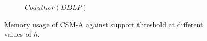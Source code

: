 \begin{figure}[b]
\begin{subfigure}[b]{0.25\textwidth}
		\caption{\scriptsize $Coauthor(DBLP)$}
		\label{fig:coauthor_mem_hops}
	\end{subfigure}%
	\caption{Memory usage of {\sf CSM-A} against support threshold at different values of $h$.}
	\label{fig:mem_hops}
	\vspace{-3mm}
\end{figure}
